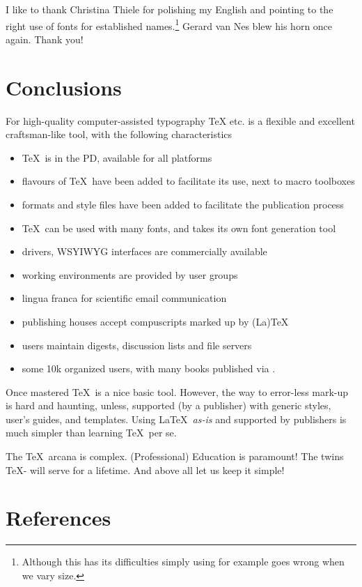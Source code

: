 I like to thank Christina Thiele for polishing my English
and pointing to the right use of fonts for established names.\footnote{Although
   this has its difficulties simply using  for example goes wrong
   when we vary size.}
Gerard van Nes blew his horn once again. Thank you!

\section*{Conclusions}
For high-quality computer-assisted typography \TeX{} etc.{} is
a flexible and excellent craftsman-like tool,
with the following characteristics
\begin{itemize}
\item \TeX\ is in the PD, available for all platforms
\item flavours of \TeX\ have been added
to facilitate its use, next to macro toolboxes
\item formats and style files have been added to facilitate the publication
process
\item \TeX\ can be used with many fonts, and takes its own font generation tool
\item drivers, WSYIWYG interfaces are commercially available
\item working environments are provided by user groups
\item lingua franca for scientific email communication
\item publishing houses accept compuscripts marked up by (La)\TeX
\item users maintain digests, discussion lists and file servers
\item some 10k organized users, with many books published via \AllTeX.
\end{itemize}
\noindent
Once mastered \TeX\ is a nice basic tool.
However, the way to error-less mark-up is hard and haunting, unless,
supported (by a publisher) with
generic styles,
user's guides, and
templates.
Using \LaTeX\ {\em as-is\/} and
supported by publishers is much simpler
than learning \TeX\ per se.

The \TeX\ arcana is complex.
(Professional) Education is paramount!
The twins \TeX-\MF{} will serve for a lifetime.
And above all let us keep it simple!
\section*{References}
\begin{thebibliography}{xxxxx}

%
  \def\tubissue#1(#2){{\sl TUGboat\/} {\bf#1} (#2)}
  \def\ls#1{\ea\bibitem{}#1\endgraf}

\end{thebibliography}











